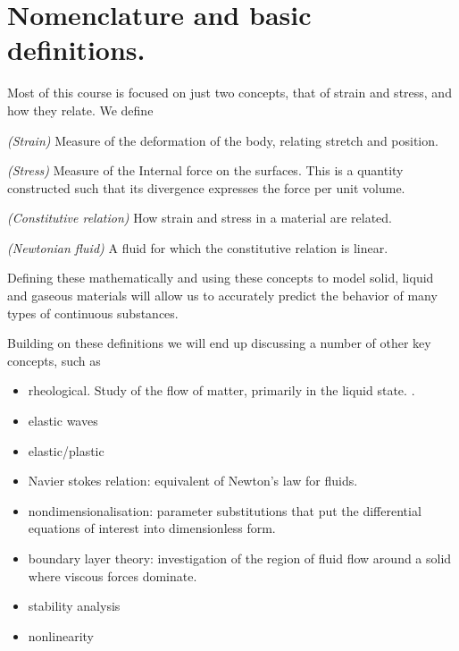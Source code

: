 
\section{Nomenclature and basic definitions.}

Most of this course is focused on just two concepts, that of strain and stress, and how they relate.  We define

\begin{definition}
\emph{(Strain)} 
\label{dfn:continuumL2:30}
Measure of the deformation of the body, relating stretch and position.
\end{definition}

\begin{definition}
\emph{(Stress)} 
\label{dfn:continuumL2:10}
Measure of the Internal force on the surfaces.  This is a quantity constructed such that its divergence expresses the force per unit volume.
\end{definition}

\begin{definition}
\emph{(Constitutive relation)} 
\label{dfn:continuumL2:20}
How strain and stress in a material are related.
\end{definition}

\begin{definition}
\emph{(Newtonian fluid)} 
\label{dfn:continuumL2:40}
A fluid for which the constitutive relation is linear.
\end{definition}

Defining these mathematically and using these concepts to model solid, liquid and gaseous materials will allow us to accurately predict the behavior of many types of continuous substances.

Building on these definitions we will end up discussing a number of other key concepts, such as

\begin{itemize}
\item rheological.  Study of the flow of matter, primarily in the liquid state.  \cite{wiki:rheology}.
\item elastic waves
\item elastic/plastic
\item Navier stokes relation: equivalent of Newton's law for fluids.
\item nondimensionalisation: parameter substitutions that put the differential equations of interest into dimensionless form.
\item boundary layer theory: investigation of the region of fluid flow around a solid where viscous forces dominate.
\item stability analysis
\item nonlinearity 
\end{itemize}

